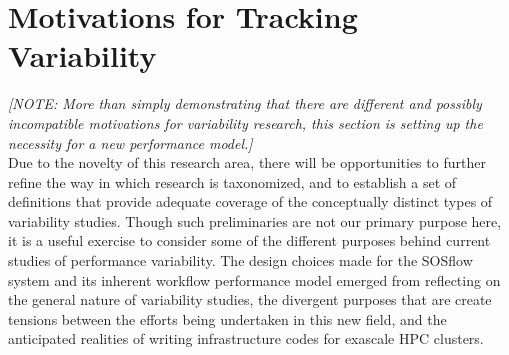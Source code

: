 \documentclass[10pt, conference, compsocconf]{IEEEtran}
\begin{document}
\section{Motivations for Tracking Variability}
\textit{[NOTE: More than simply demonstrating that there are different and 
possibly incompatible motivations for variability research, this section is 
setting up the necessity for a new performance model.]}\\
Due to the novelty of this research area, there will be opportunities to 
further refine the way in which research is taxonomized, and to establish 
a set of definitions that provide adequate coverage of the conceptually distinct 
types of variability studies. Though such preliminaries are not our primary 
purpose here, it is a  useful  exercise to consider some of the different 
purposes behind current studies of performance variability. The design choices 
made for the SOSflow system and its inherent workflow performance model emerged 
from reflecting on the general nature of variability studies, the 
divergent purposes that are create tensions between the efforts being 
undertaken in this new field, and the anticipated realities of writing 
infrastructure codes for exascale HPC clusters.
\end{document}
